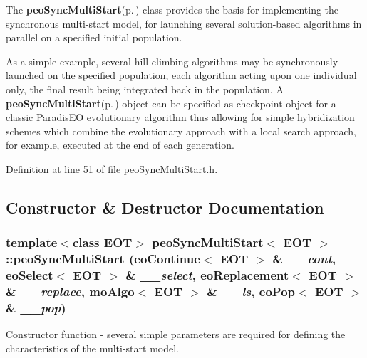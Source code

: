 The {\bf peo\-Sync\-Multi\-Start}{\rm (p.\,\pageref{classpeo_sync_multi_start})} class provides the basis for implementing the synchronous multi-start model, for launching several solution-based algorithms in parallel on a specified initial population. 

As a simple example, several hill climbing algorithms may be synchronously launched on the specified population, each algorithm acting upon one individual only, the final result being integrated back in the population. A {\bf peo\-Sync\-Multi\-Start}{\rm (p.\,\pageref{classpeo_sync_multi_start})} object can be specified as checkpoint object for a classic Paradis\-EO evolutionary algorithm thus allowing for simple hybridization schemes which combine the evolutionary approach with a local search approach, for example, executed at the end of each generation. 



Definition at line 51 of file peo\-Sync\-Multi\-Start.h.

\subsection{Constructor \& Destructor Documentation}
\subsubsection{\setlength{\rightskip}{0pt plus 5cm}template$<$class EOT$>$ {\bf peo\-Sync\-Multi\-Start}$<$ EOT $>$::{\bf peo\-Sync\-Multi\-Start} (eo\-Continue$<$ EOT $>$ \& {\em \_\-\_\-cont}, eo\-Select$<$ EOT $>$ \& {\em \_\-\_\-select}, eo\-Replacement$<$ EOT $>$ \& {\em \_\-\_\-replace}, mo\-Algo$<$ EOT $>$ \& {\em \_\-\_\-ls}, eo\-Pop$<$ EOT $>$ \& {\em \_\-\_\-pop})}\label{classpeo_sync_multi_start_d29f94aad3c1f443bfffc8b6aee0704c}


Constructor function - several simple parameters are required for defining the characteristics of the multi-start model. 

